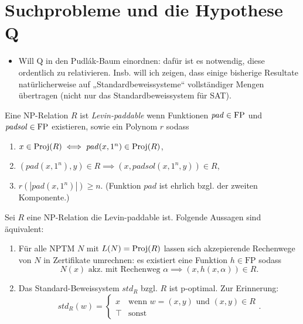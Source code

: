 \chapter{Suchprobleme und die Hypothese Q}

\begin{itemize}
    \item Will Q in den Pudlák-Baum einordnen: dafür ist es notwendig, diese ordentlich zu relativieren. Insb. will ich zeigen, dass einige bisherige Resultate natürlicherweise auf „Standardbeweissysteme“ vollständiger Mengen übertragen (nicht nur das Standardbeweissystem für SAT).
\end{itemize}


\begin{definition}
    Eine NP-Relation $R$ ist \emph{Levin-paddable} wenn 
    Funktionen $\mathit{pad}\in\mathrm{FP}$ und $\mathit{padsol}\in\mathrm{FP}$ existieren, sowie ein Polynom $r$ sodass
    \begin{enumerate}
        \item $x\in \operatorname{Proj}(R) \iff \mathit{pad}(x, 1^n) \in \operatorname{Proj}(R)$,
        \item $(\mathit{pad}(x, 1^n), y)\in R \implies (x, \mathit{padsol}(x, 1^n, y)) \in R$,
        \item $r(|\mathit{pad}(x, 1^n)|)\geq n$. (Funktion $\mathit{pad}$ ist ehrlich bzgl. der zweiten Komponente.)\qedhere
    \end{enumerate}
\end{definition}

\begin{lemma}\label{lemma:stdps-q}
    Sei $R$ eine NP-Relation die Levin-paddable ist. Folgende Aussagen sind äquivalent:
    \begin{enumerate}
        \item Für alle NPTM $N$ mit $L(N)=\operatorname{Proj}(R)$ lassen sich akzepierende Rechenwege von $N$ in Zertifikate umrechnen: es existiert eine Funktion $h\in\mathrm{FP}$ sodass
            \[ N(x) \text{ akz. mit Rechenweg $\alpha$} \implies (x,h(x,\alpha))\in R. \]
        \item Das Standard-Beweissystem $\mathit{std}_R$ bzgl. $R$ ist p-optimal. Zur Erinnerung: 
            \[ \mathit{std}_R(w) = \begin{cases} x & \text{wenn $w=(x,y)$ und $(x,y)\in R$}\\
            \top & \text{sonst}\end{cases}. \] 
    \end{enumerate}
\end{lemma}

